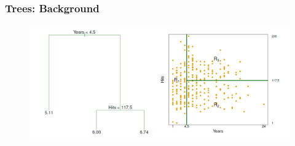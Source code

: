 \documentclass[
  shownotes,
  xcolor={svgnames},
  hyperref={colorlinks,citecolor=DarkBlue,linkcolor=DarkRed,urlcolor=DarkBlue}
  , aspectratio=169]{beamer}
\begin{document}
\begin{frame}[fragile]
\frametitle{Trees: Background}



\begin{figure}[H] \centering
            \captionsetup{justification=centering}
              \includegraphics[scale=0.4]{figures/hitters.png}                           
 \end{figure}


\end{frame}
\end{document}

